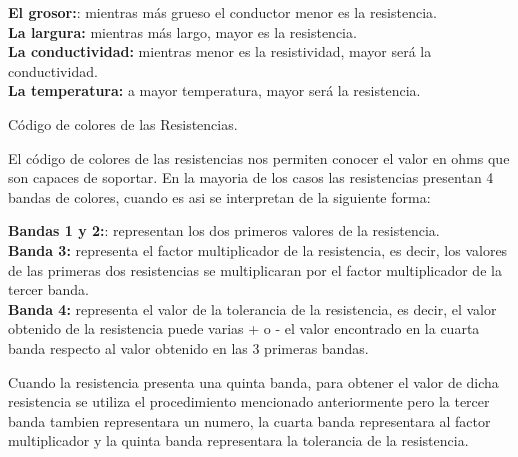 \documentclass[11pt,a4paper]{report}
\begin{document}
\begin{flushleft}
	\textbf{El grosor:}: mientras más grueso el conductor menor es la resistencia.\\
	\textbf{La largura:} mientras más largo, mayor es la resistencia.\\
	\textbf{La conductividad:} mientras menor es la resistividad, mayor será la conductividad.\\
	\textbf{La temperatura:} a mayor temperatura, mayor será la resistencia.\\
	\vspace*{0.5cm}
	
	\begin{Large}
		C\'odigo de colores de las Resistencias.\\
		\vspace*{0.5cm}
	\end{Large}
	
	El c\'odigo de colores de las resistencias nos permiten conocer el valor en ohms que son capaces de soportar. En la mayoria de los casos las resistencias presentan 4 bandas de colores, cuando es asi se interpretan de la siguiente forma:\\
	\vspace*{0.5cm}
	
	\textbf{Bandas 1 y 2:}: representan los dos primeros valores de la resistencia.\\
	\textbf{Banda 3:} representa el factor multiplicador de la resistencia, es decir, los valores de las primeras dos resistencias se multiplicaran por el factor multiplicador de la tercer banda.\\
	\textbf{Banda 4:} representa el valor de la tolerancia de la resistencia, es decir, el valor obtenido de la resistencia puede varias + o - el valor encontrado en la cuarta banda respecto al valor obtenido en las 3 primeras bandas.\\
	\vspace*{0.5cm}
	
	Cuando la resistencia presenta una quinta banda, para obtener el valor de dicha resistencia se utiliza el procedimiento mencionado anteriormente pero la tercer banda tambien representara un numero, la cuarta banda representara al factor multiplicador y la quinta banda representara la tolerancia de la resistencia.\\
	
	
\end{flushleft}
\end{document}

